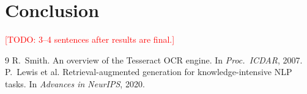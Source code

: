 \documentclass[11pt]{article}
\newcommand{\todo}[1]{\textcolor{red}{[TODO: #1]}}
\begin{document}
\section{Conclusion}
\todo{3--4 sentences after results are final.}

\begin{thebibliography}{9}
R.~Smith. An overview of the Tesseract OCR engine. In \emph{Proc.\ ICDAR}, 2007.
P.~Lewis et al. Retrieval-augmented generation for knowledge-intensive NLP
tasks. In \emph{Advances in NeurIPS}, 2020.
\end{thebibliography}
\end{document}
